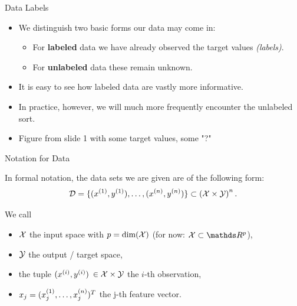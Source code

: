 \documentclass[11pt,compress,t,notes=noshow, xcolor=table]{beamer}
\begin{document}

\begin{vbframe}{Data Labels}

\begin{itemize}

  \item We distinguish two basic forms our data may come in:
  
  \begin{itemize}
  
    \item For \textbf{labeled} data we have already observed the target values 
    \emph{(labels)}.
    
    \item For \textbf{unlabeled} data these remain unknown.
  
  \end{itemize}
  
  \item It is easy to see how labeled data are vastly more informative.
  
  \item In practice, however, we will much more frequently encounter the
  unlabeled sort.
  
  \item \color{red} Figure from slide 1 with some target values, some "?"

\end{itemize}

\end{vbframe}


\begin{vbframe}{Notation for Data}

In formal notation, the data sets we are given are of the following form:
\[
\mathcal{D} = \{ (x^{(1)}, y^{(1)}), \ldots, (x^{(n)}, y^{(n)})\} \subset \left(\mathcal{X} \times \mathcal{Y}\right)^n.
\]

We call

\begin{itemize}

  \item $\mathcal{X}$  the input space with $p = \text{dim}(\mathcal{X})$ (for now: 
  $\Xspace \subset \R^p$),
  
  \item $\mathcal{Y}$ the output / target space,
  
  \item the tuple \((x^{(i)}, y^{(i)})\) $\in \mathcal{X}\times \mathcal{Y}$ the \(i\)-th observation,
  
  \item $x_j = (x^{(1)}_j, \ldots, x^{(n)}_j)^T$ the j-th feature vector.
  
\end{itemize}

\end{vbframe}
\end{document}
